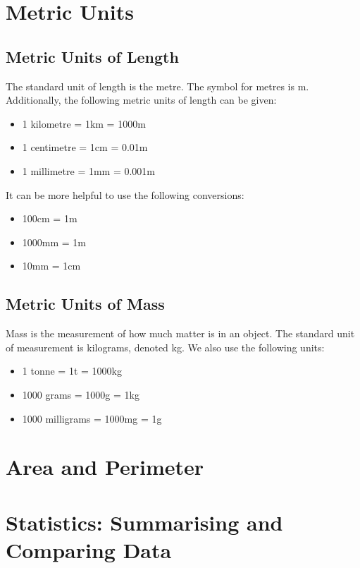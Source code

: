\documentclass{article}
\begin{document}
\newpage
\section{Metric Units}

\subsection{Metric Units of Length}

The standard unit of length is the metre. The symbol for metres is m. Additionally, the following metric units of length can be given:

\begin{itemize}
    \item 1 kilometre = 1km = 1000m
    \item 1 centimetre = 1cm = 0.01m
    \item 1 millimetre = 1mm = 0.001m
\end{itemize}

It can be more helpful to use the following conversions:

\begin{itemize}
    \item 100cm = 1m
    \item 1000mm = 1m
    \item 10mm = 1cm
\end{itemize}

\subsection{Metric Units of Mass}

Mass is the measurement of how much matter is in an object. The standard unit of measurement is kilograms, denoted kg. We also use the following units:

\begin{itemize}
    \item 1 tonne = 1t = 1000kg
    \item 1000 grams = 1000g = 1kg
    \item 1000 milligrams = 1000mg = 1g
\end{itemize}

\newpage
\section{Area and Perimeter}



\newpage
\section{Statistics: Summarising and Comparing Data}
\end{document}
